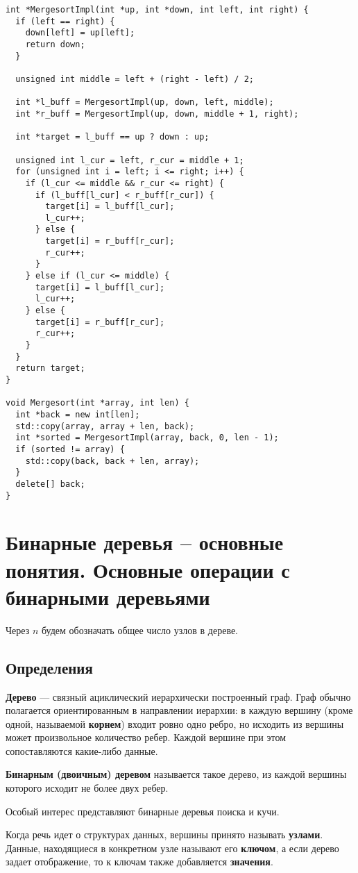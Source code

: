 \begin{verbatim}
int *MergesortImpl(int *up, int *down, int left, int right) {
  if (left == right) {
    down[left] = up[left];
    return down;
  }

  unsigned int middle = left + (right - left) / 2;

  int *l_buff = MergesortImpl(up, down, left, middle);
  int *r_buff = MergesortImpl(up, down, middle + 1, right);

  int *target = l_buff == up ? down : up;

  unsigned int l_cur = left, r_cur = middle + 1;
  for (unsigned int i = left; i <= right; i++) {
    if (l_cur <= middle && r_cur <= right) {
      if (l_buff[l_cur] < r_buff[r_cur]) {
        target[i] = l_buff[l_cur];
        l_cur++;
      } else {
        target[i] = r_buff[r_cur];
        r_cur++;
      }
    } else if (l_cur <= middle) {
      target[i] = l_buff[l_cur];
      l_cur++;
    } else {
      target[i] = r_buff[r_cur];
      r_cur++;
    }
  }
  return target;
}

void Mergesort(int *array, int len) {
  int *back = new int[len];
  std::copy(array, array + len, back);
  int *sorted = MergesortImpl(array, back, 0, len - 1);
  if (sorted != array) {
    std::copy(back, back + len, array);
  }
  delete[] back;
}
\end{verbatim}

\section{Бинарные деревья – основные понятия. Основные операции с бинарными деревьями}
Через $n$ будем обозначать общее число узлов в дереве.
\subsection{Определения}
\textbf{Дерево} --- связный ациклический иерархически построенный граф. Граф обычно
полагается ориентированным в направлении иерархии: в каждую вершину (кроме одной,
называемой \textbf{корнем}) входит ровно одно ребро, но исходить из вершины может
произвольное количество ребер. Каждой вершине при этом сопоставляются какие-либо данные.

\textbf{Бинарным (двоичным) деревом} называется такое дерево, из каждой вершины которого
исходит не более двух ребер.

Особый интерес представляют бинарные деревья поиска и кучи.

Когда речь идет о структурах данных, вершины принято называть \textbf{узлами}.
Данные, находящиеся в конкретном узле называют его \textbf{ключом}, а если дерево задает
отображение, то к ключам также добавляется \textbf{значения}.

